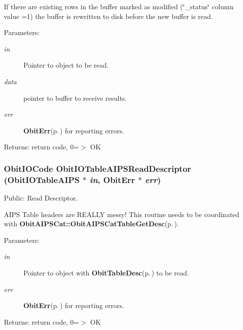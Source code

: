 If there are existing rows in the buffer marked as modified (\char`\"{}\_\-status\char`\"{} column value =1) the buffer is rewritten to disk before the new buffer is read. \begin{Desc}
\item[Parameters:]
\begin{description}
\item[{\em in}]Pointer to object to be read. \item[{\em data}]pointer to buffer to receive results. \item[{\em err}]{\bf Obit\-Err}{\rm (p.\,\pageref{structObitErr})} for reporting errors. \end{description}
\end{Desc}
\begin{Desc}
\item[Returns:]return code, 0=$>$ OK \end{Desc}
\subsubsection{\setlength{\rightskip}{0pt plus 5cm}Obit\-IOCode Obit\-IOTable\-AIPSRead\-Descriptor ({\bf Obit\-IOTable\-AIPS} $\ast$ {\em in}, {\bf Obit\-Err} $\ast$ {\em err})}\label{ObitIOTableAIPS_8c_a23}


Public: Read Descriptor. 

AIPS Table headers are REALLY messy! This routine needs to be coordinated with {\bf Obit\-AIPSCat::Obit\-AIPSCat\-Table\-Get\-Desc}{\rm (p.\,\pageref{ObitAIPSCat_8c_a11})}. \begin{Desc}
\item[Parameters:]
\begin{description}
\item[{\em in}]Pointer to object with {\bf Obit\-Table\-Desc}{\rm (p.\,\pageref{structObitTableDesc})} to be read. \item[{\em err}]{\bf Obit\-Err}{\rm (p.\,\pageref{structObitErr})} for reporting errors. \end{description}
\end{Desc}
\begin{Desc}
\item[Returns:]return code, 0=$>$ OK \end{Desc}
